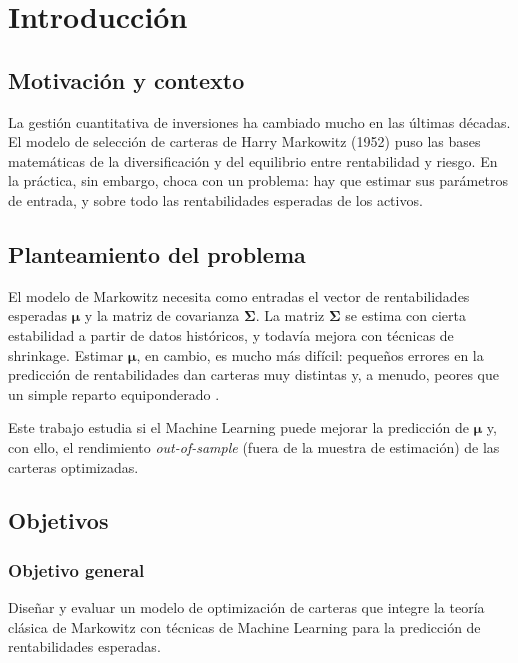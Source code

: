 \chapter{Introducción}
\label{ch:introduccion}

\section{Motivación y contexto}

La gestión cuantitativa de inversiones ha cambiado mucho en las últimas
décadas. El modelo de selección de carteras de Harry Markowitz (1952) puso las
bases matemáticas de la diversificación y del equilibrio entre rentabilidad y
riesgo. En la práctica, sin embargo, choca con un problema: hay que estimar sus
parámetros de entrada, y sobre todo las rentabilidades esperadas de los activos.

\section{Planteamiento del problema}

El modelo de Markowitz necesita como entradas el vector de rentabilidades
esperadas $\boldsymbol{\mu}$ y la matriz de covarianza $\boldsymbol{\Sigma}$. La
matriz $\boldsymbol{\Sigma}$ se estima con cierta estabilidad a partir de datos
históricos, y todavía mejora con técnicas de shrinkage. Estimar
$\boldsymbol{\mu}$, en cambio, es mucho más difícil: pequeños errores en la
predicción de rentabilidades dan carteras muy distintas y, a menudo, peores que
un simple reparto equiponderado \cite{DeMiguel2009}.

Este trabajo estudia si el Machine Learning puede mejorar la predicción de
$\boldsymbol{\mu}$ y, con ello, el rendimiento \emph{out-of-sample} (fuera de la
muestra de estimación) de las carteras optimizadas.

\section{Objetivos}

\subsection{Objetivo general}

Diseñar y evaluar un modelo de optimización de carteras que integre la
teoría clásica de Markowitz con técnicas de Machine Learning para la
predicción de rentabilidades esperadas.

